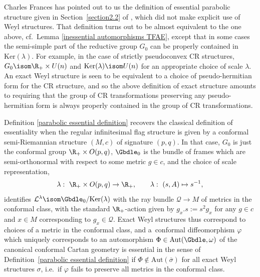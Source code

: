 \begin{Remark} Charles Frances has pointed out to us the def\/inition of essential parabolic structure given in Section~\ref{section2.2} of \cite{FrEss}, which did not make explicit use of Weyl structures. That def\/inition turns out to be almost equivalent to the one above, cf.\ Lemma \ref{inessential automorphisms TFAE}, except that in some cases the semi-simple part of the reductive group $G_0$ can be properly contained in $\mathrm{Ker}(\lambda)$. For example, in the case of strictly pseudoconvex CR structures, $G_0 \isom \R_+ \times U(n)$ and $\mathrm{Ker}(\lambda) \isom U(n)$ for an appropriate choice of scale $\lambda$. An exact Weyl structure is seen to be equivalent to a choice of pseudo-hermitian form for the CR structure, and so the above def\/inition of exact structure amounts to requiring that the group of CR transformations preserving any pseudo-hermitian form is always properly contained in the group of CR transformations.
\end{Remark}

\begin{Remark} Def\/inition \ref{parabolic essential definition} recovers the classical def\/inition of essentiality when the regular inf\/initesimal f\/lag structure is given by a conformal semi-Riemannian structure $(M,c)$ of signature $(p,q)$. In that case, $G_0$ is just the conformal group $\R_+ \times O(p,q)$, $\Gbdle_0$ is the bundle of frames which are semi-orthonormal with respect to some metric $g \in c$, and the choice of scale representation,
\begin{gather*}
 \lambda: \ \R_+ \times O(p,q) \rightarrow \R_+, \qquad
 \lambda: \ (s,A) \mapsto s^{-1},
\end{gather*}
identif\/ies $\mathcal{L}^{\lambda} \isom \Gbdle_0/\mathrm{Ker}(\lambda)$ with the ray bundle $\mathcal{Q} \rightarrow M$ of metrics in the conformal class, with the standard $\R_+$-action given by $g_x.s := s^2g_x$ for any $g \in c$ and $x \in M$ corresponding to $g_x \in \mathcal{Q}$. Exact Weyl structures thus correspond to choices of a metric in the conformal class, and a~conformal dif\/feomorphism $\varphi$ which uniquely corresponds to an automorphism $\Phi \in \mathrm{Aut}(\Gbdle,\omega)$ of the canonical conformal Cartan geometry is essential in the sense of Def\/inition~\ref{parabolic essential definition} if $\Phi \notin \mathrm{Aut}(\overline{\sigma})$ for all exact Weyl structures $\sigma$, i.e.\ if $\varphi$ fails to preserve all metrics in the conformal class.
\end{Remark}

